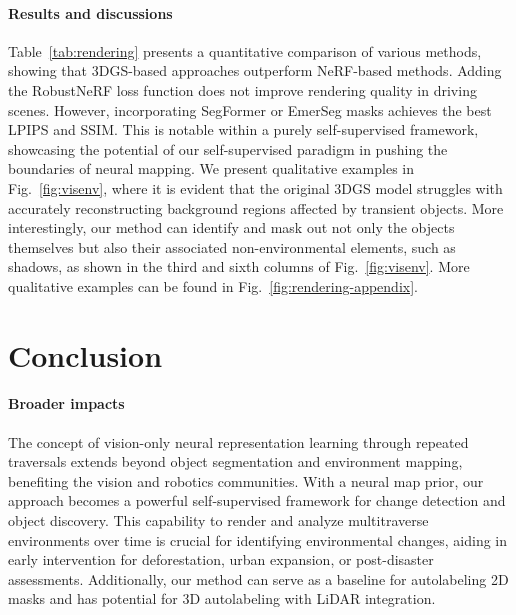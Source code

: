 
\paragraph{Results and discussions} Table~\ref{tab:rendering} presents a quantitative comparison of various methods, showing that 3DGS-based approaches outperform NeRF-based methods. Adding the RobustNeRF loss function does not improve rendering quality in driving scenes. However, incorporating SegFormer or EmerSeg masks achieves the best LPIPS and SSIM. This is notable within a purely self-supervised framework, showcasing the potential of our self-supervised paradigm in pushing the boundaries of neural mapping. We present qualitative examples in Fig.~\ref{fig:visenv}, where it is evident that the original 3DGS model struggles with accurately reconstructing background regions affected by transient objects. More interestingly, our method can identify and mask out not only the objects themselves but also their associated non-environmental elements, such as shadows, as shown in the third and sixth columns of Fig.~\ref{fig:visenv}. More qualitative examples can be found in Fig.~\ref{fig:rendering-appendix}.



\section{Conclusion}
\label{sec:conclusion}
\paragraph{Broader impacts}
The concept of vision-only neural representation learning through repeated traversals extends beyond object segmentation and environment mapping, benefiting the vision and robotics communities. With a neural map prior, our approach becomes a powerful self-supervised framework for change detection and object discovery. This capability to render and analyze multitraverse environments over time is crucial for identifying environmental changes, aiding in early intervention for deforestation, urban expansion, or post-disaster assessments. Additionally, our method can serve as a baseline for autolabeling 2D masks and has potential for 3D autolabeling with LiDAR integration.

